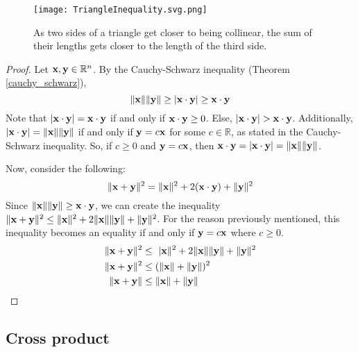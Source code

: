 \documentclass[../main.tex]{subfiles}
\begin{document}
\begin{figure}[H]
	\centering
	\texttt{[image: TriangleInequality.svg.png]}
	\caption{As two sides of a triangle get closer to being collinear,
		the sum of their lengths gets closer to the length of the third side.}
\end{figure}

\begin{proof}
	Let $\mathbf{x}, \mathbf{y} \in \mathbb{R}^n$.
	By the Cauchy-Schwarz inequality (Theorem \ref{cauchy_schwarz}),
	\[\|\mathbf{x}\|\|\mathbf{y}\|\geq |\mathbf{x}\cdot\mathbf{y}|\geq\mathbf{x}\cdot\mathbf{y}\]
	Note that $|\mathbf{x}\cdot\mathbf{y}|=\mathbf{x}\cdot\mathbf{y}$ if and only if
	$\mathbf{x}\cdot\mathbf{y}\geq0$. Else, $|\vect{x}\cdot\vect{y}|>\vect{x}\cdot\vect{y}$.
	Additionally, $|\mathbf{x}\cdot\mathbf{y}|=\|\mathbf{x}\|\|\mathbf{y}\|$ if and only if
	$\mathbf{y}=c\mathbf{x}$ for some $c \in \mathbb{R}$, as stated in the Cauchy-Schwarz inequality.
	So, if $c\geq0$ and $\mathbf{y}=c\mathbf{x}$, then
	$\mathbf{x}\cdot\mathbf{y}=|\mathbf{x}\cdot\mathbf{y}|=\|\mathbf{x}\|\|\mathbf{y}\|$.

	Now, consider the following:
	\[\|\mathbf{x} + \mathbf{y}\|^2  = \|\mathbf{x}\|^2+2(\mathbf{x}\cdot\mathbf{y})+\|\mathbf{y}\|^2 \]
	Since $\|\mathbf{x}\|\|\mathbf{y}\|\geq\mathbf{x}\cdot\mathbf{y}$,
	we can create the inequality $\|\mathbf{x}+\mathbf{y}\|^2\leq\|\mathbf{x}\|^2+2\|\mathbf{x}\|\|\mathbf{y}\|+\|\mathbf{y}\|^2$.
	For the reason previously mentioned, this inequality becomes an equality
	if and only if $\mathbf{y}=c\mathbf{x}$ where $c\geq0$.
	\begin{align*}
		\|\vect{x}+\vect{y}\|^2   & \leq\ |\vect{x}\|^2+2\|\vect{x}\|\|\vect{y}\|+\|\vect{y}\|^2 \\
		\|\vect{x} + \vect{y}\|^2 & \leq (\|\vect{x}\|+\|\vect{y}\|)^2                           \\
		\|\vect{x} + \vect{y}\|   & \leq \|\vect{x}\|+\|\vect{y}\|
	\end{align*}
\end{proof}

\subsection{Cross product}
\end{document}
